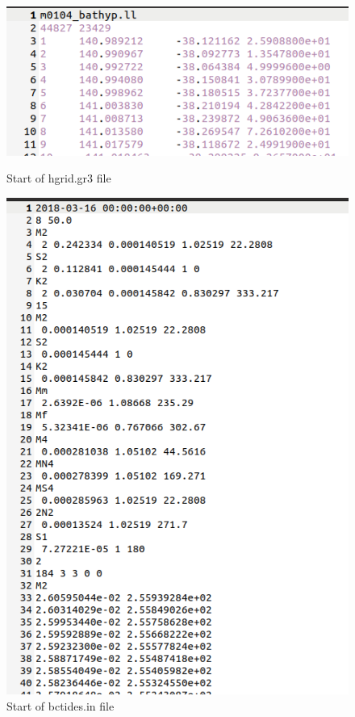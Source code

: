 \documentclass[preprints,briefreport,accept,oneauthor,pdftex]{Definitions/mdpi}
\begin{document}
\begin{figure}
    \centering
    \begin{minipage}[b]{0.45\textwidth}
        \includegraphics[width=\textwidth]{figures/hgrid.png}
    \caption{Start of hgrid.gr3 file}
    \label{fig:hgrid}
    \end{minipage}
\hfill
    \begin{minipage}[b]{0.45\textwidth}
    \centering
    \includegraphics[width=\textwidth]{figures/bctide.png}
    \caption{Start of bctides.in file}
    \label{fig:bct}
    \end{minipage}
\end{figure}
\end{document}
